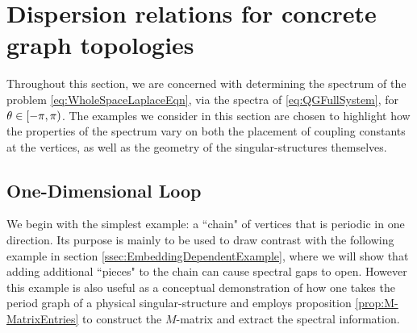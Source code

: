 \section{Dispersion relations for concrete graph topologies} \label{sec:Examples}
Throughout this section, we are concerned with determining the spectrum of the problem \eqref{eq:WholeSpaceLaplaceEqn}, via the spectra of \eqref{eq:QGFullSystem}, for $\theta\in\left[-\pi,\pi\right)$.
The examples we consider in this section are chosen to highlight how the properties of the spectrum vary on both the placement of coupling constants at the vertices, as well as the geometry of the singular-structures themselves. 

\subsection{One-Dimensional Loop} \label{ssec:Example1DLoop}
We begin with the simplest example: a ``chain" of vertices that is periodic in one direction.
Its purpose is mainly to be used to draw contrast with the following example in section \ref{ssec:EmbeddingDependentExample}, where we will show that adding additional ``pieces" to the chain can cause spectral gaps to open.
However this example is also useful as a conceptual demonstration of how one takes the period graph of a physical singular-structure and employs proposition \ref{prop:M-MatrixEntries} to construct the $M$-matrix and extract the spectral information.

